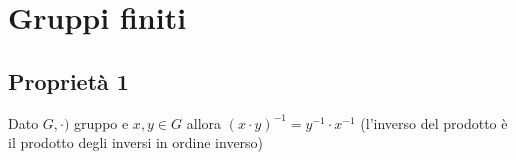 \section{Gruppi finiti}

\subsection{Proprietà 1}

Dato \(G,\cdot)\) gruppo e \(x,y\in G\) allora \((x\cdot y)^{-1}=y^{-1}\cdot x^{-1}\) (l'inverso del prodotto è il prodotto degli inversi in ordine inverso)